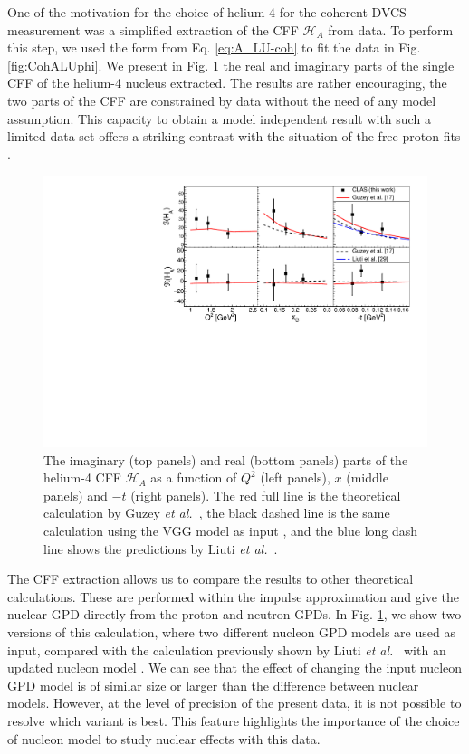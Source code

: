 \documentclass{article}
\begin{document}
One of the motivation for the choice of helium-4 for the coherent DVCS measurement was
a simplified extraction of the CFF $\mathcal{H}_A$ from
data. To perform this step, we used the form from Eq. \ref{eq:A_LU-coh} to fit the data in Fig. 
\ref{fig:CohALUphi}. We present in Fig. \ref{fig:CohCFF} the real and imaginary parts 
of the single CFF of the helium-4 nucleus extracted. The results are rather encouraging, the two parts
of the CFF are constrained by data without the need of any model assumption. This capacity to obtain a
model independent result with such a limited data set offers a striking contrast with the
situation of the free proton fits \cite{Dupre:2016mai,Dupre:2017hfs}.

\begin{figure}[tbp!]
\center
\includegraphics[width=14cm]{fig3/Coherent_CFF.pdf}
	\caption{The imaginary (top panels) and real (bottom panels) parts of the helium-4
	CFF $\mathcal{H}_A$ as a function of $Q^2$ (left panels), $x$ (middle panels) and 
	$-t$ (right panels). The red full line is the theoretical calculation by 
	Guzey {\it et al.}~\cite{Guzey:2003jh,Guzey:2008th}, the black dashed line is the same calculation 
	using the VGG model as input \cite{Vanderhaeghen:1999xj,Guidal:2004nd}, and
	the blue long dash line shows the predictions by Liuti {\it et 
	al.}~\cite{Liuti:2005gi,GonzalezHernandez:2012jv}.} 
\label{fig:CohCFF}
\end{figure}

The CFF extraction allows us to compare the results to other theoretical calculations.
These are performed within the impulse approximation \cite{Guzey:2003jh,Guzey:2008th} 
and give the nuclear GPD directly from the proton and neutron GPDs. In 
Fig. \ref{fig:CohCFF}, we show two versions of this calculation, where two different nucleon GPD
models are used as input, compared with the calculation previously shown by Liuti 
{\it et al.}~\cite{Liuti:2005gi} with an updated nucleon model \cite{GonzalezHernandez:2012jv}.
We can see that the effect of changing the input nucleon GPD model
is of similar size or larger than the difference between nuclear 
models. However, at the level of precision of the present data,
it is not possible to resolve which variant is best. This feature highlights the 
importance of the choice of nucleon model to study nuclear effects with this data.
\end{document}
